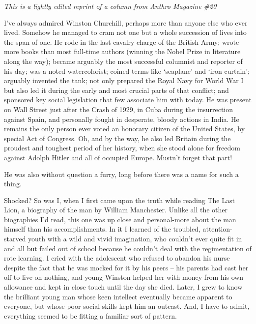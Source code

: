
\textit{This is a lightly edited reprint of a column from Anthro Magazine \#20}

I've always admired Winston Churchill, perhaps more than anyone else who ever lived. Somehow he managed to cram not one but a whole succession of lives into the span of one. He rode in the last cavalry charge of the British Army; wrote more books than most full-time authors (winning the Nobel Prize in literature along the way); became arguably the most successful columnist and reporter of his day; was a noted watercolorist; coined terms like `seaplane' and `iron curtain'; arguably invented the tank; not only prepared the Royal Navy for World War I but also led it during the early and most crucial parts of that conflict; and sponsored key social legislation that few associate him with today. He was present on Wall Street just after the Crash of 1929, in Cuba during the insurrection against Spain, and personally fought in desperate, bloody actions in India. He remains the only person ever voted an honorary citizen of the United States, by special Act of Congress. Oh, and by the way, he also led Britain during the proudest and toughest period of her history, when she stood alone for freedom against Adolph Hitler and all of occupied Europe. Mustn't forget that part!

He was also without question a furry, long before there was a name for such a thing.

Shocked? So was I, when I first came upon the truth while reading The Last Lion, a biography of the man by William Manchester. Unlike all the other biographies I'd read, this one was up close and personal-more about the man himself than his accomplishments. In it I learned of the troubled, attention-starved youth with a wild and vivid imagination, who couldn't ever quite fit in and all but failed out of school because he couldn't deal with the regimentation of rote learning. I cried with the adolescent who refused to abandon his nurse despite the fact that he was mocked for it by his peers -- his parents had cast her off to live on nothing, and young Winston helped her with money from his own allowance and kept in close touch until the day she died. Later, I grew to know the brilliant young man whose keen intellect eventually became apparent to everyone, but whose poor social skills kept him an outcast. And, I have to admit, everything seemed to be fitting a familiar sort of pattern.

